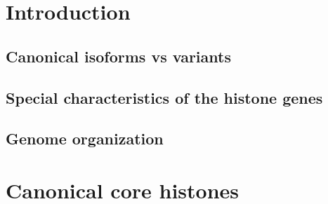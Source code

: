 \documentclass[10pt,a4paper,draft]{article}
\begin{document}
  \section{Introduction}

    \subsection{Canonical isoforms vs variants}

    \subsection{Special characteristics of the histone genes}

    \subsection{Genome organization}
    

  \section{Canonical core histones}
\end{document}
